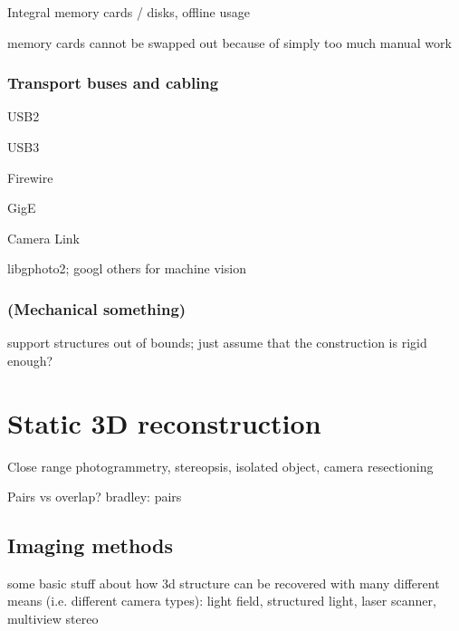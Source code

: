 Integral memory cards / disks, offline usage

memory cards cannot be swapped out because of simply too much manual work

\subsubsection{Transport buses and cabling}

USB2

USB3

Firewire

GigE

Camera Link

libgphoto2; googl others for machine vision

\subsubsection{(Mechanical something)}

support structures out of bounds; just assume that the construction is rigid enough?


\clearpage
\section{Static 3D reconstruction}





Close range photogrammetry, stereopsis, isolated object, camera resectioning

Pairs vs overlap? bradley: pairs


\subsection{Imaging methods} %


some basic stuff about how 3d structure can be recovered with many different means (i.e. different camera types): light field, structured light, laser scanner, multiview stereo

